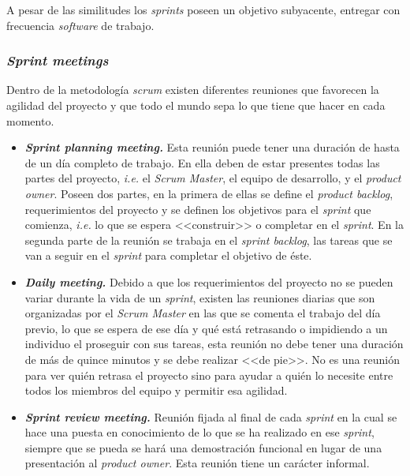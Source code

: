 A pesar de las similitudes los \textit{sprints} poseen un objetivo subyacente, entregar con frecuencia \textit{software} de trabajo.

\subsubsection{\textit{Sprint meetings}}
Dentro de la metodología \textit{scrum} existen diferentes reuniones que favorecen la agilidad del proyecto y que todo el mundo sepa lo que tiene que hacer en cada momento.
\begin{itemize}
\item \textbf{\textit{Sprint planning meeting.}} Esta reunión puede tener una duración de hasta de un día completo de trabajo. En ella deben de estar presentes todas las partes del proyecto, \textit{i.e.} el \textit{Scrum Master}, el equipo de desarrollo, y el \textit{product owner}. Poseen dos partes, en la primera de ellas se define el \textit{product backlog}, requerimientos del proyecto y se definen los objetivos para el \textit{sprint} que comienza, \textit{i.e.} lo que se espera <<construir>> o completar en el \textit{sprint}. En la segunda parte de la reunión se trabaja en el \textit{sprint backlog}, las tareas que se van a seguir en el \textit{sprint} para completar el objetivo de éste.
\item \textbf{\textit{Daily meeting.}} Debido a que los requerimientos del proyecto no se pueden variar durante la vida de un \textit{sprint}, existen las reuniones diarias que son organizadas por el \textit{Scrum Master} en las que se comenta el trabajo del día previo, lo que se espera de ese día y qué está retrasando o impidiendo a un individuo el proseguir con sus tareas, esta reunión no debe tener una duración de más de quince minutos y se debe realizar <<de pie>>. No es una reunión para ver quién retrasa el proyecto sino para ayudar a quién lo necesite entre todos los miembros del equipo y permitir esa agilidad.
\item \textbf{\textit{Sprint review meeting.}} Reunión fijada al final de cada \textit{sprint} en la cual se hace una puesta en conocimiento de lo que se ha realizado en ese \textit{sprint}, siempre que se pueda se hará una demostración funcional en lugar de una presentación al \textit{product owner}. Esta reunión tiene un carácter informal.
\end{itemize}
 
